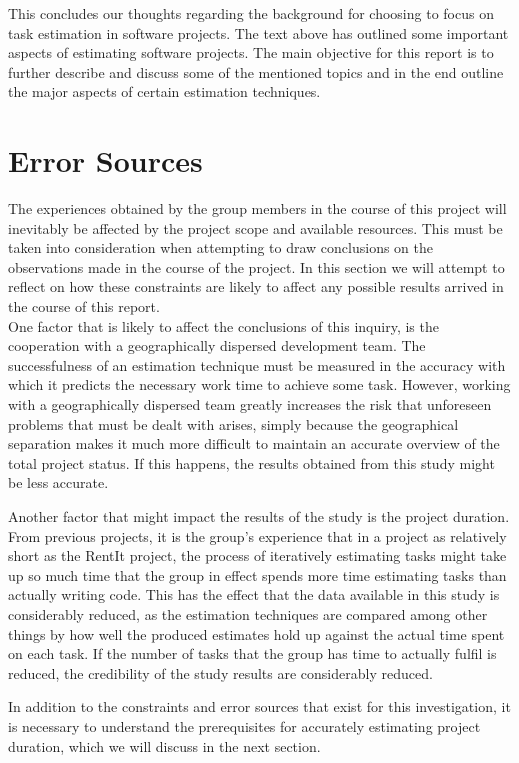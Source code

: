 This concludes our thoughts regarding the background for choosing to focus on task estimation in software projects. The text above has outlined some important aspects of estimating software projects. The main objective for this report is to further describe and discuss some of the mentioned topics and in the end outline the major aspects of certain estimation techniques.

\section{Error Sources}
The experiences obtained by the group members in the course of this project will inevitably be affected by the project scope and available resources. This must be taken into consideration when attempting to draw conclusions on the observations made in the course of the project. In this section we will attempt to reflect on how these constraints are likely to affect any possible results arrived in the course of this report.\\
One factor that is likely to affect the conclusions of this inquiry, is the cooperation with a geographically dispersed development team. The successfulness of an estimation technique must be measured in the accuracy with which it predicts the necessary work time to achieve some task. However, working with a geographically dispersed team greatly increases the risk that unforeseen problems that must be dealt with arises, simply because the geographical separation makes it much more difficult to maintain an accurate overview of the total project status. If this happens, the results obtained from this study might be less accurate.

Another factor that might impact the results of the study is the project duration. From previous projects, it is the group's experience that in a project as relatively short as the RentIt project, the process of iteratively estimating tasks might take up so much time that the group in effect spends more time estimating tasks than actually writing code. This has the effect that the data available in this study is considerably reduced, as the estimation techniques are compared among other things by how well the produced estimates hold up against the actual time spent on each task. If the number of tasks that the group has time to actually fulfil is reduced, the credibility of the study results are considerably reduced.

In addition to the constraints and error sources that exist for this investigation, it is necessary to understand the prerequisites for accurately estimating project duration, which we will discuss in the next section.

